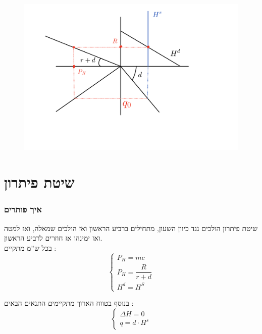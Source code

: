 \documentclass[usenames,dvipsnames]{beamer}
\newcommand{\D}[1]{\Delta #1}
\begin{document}
\begin{RTL}
\begin{frame}[allowframebreaks]
\framebreak
\begin{figure}
    \begin{small}
        \begin{center}
            \includegraphics[width=1.2\textwidth]{figures/SCR-20231209-nblm.png}
        \end{center}
    \end{small}
\end{figure}


\end{frame}

\section{שיטת פיתרון}

\begin{frame}
    \frametitle{איך פותרים}
    \begin{block}{שיטת פיתרון}
        הולכים נגד כיוון השעון, מתחילים ברביע הראשון ואז הולכים שמאלה, ואז למטה ואז ימינהו אז חוזרים לרביע הראשון.
        \\
        בכל ש''מ מתקיים :
        $$\begin{cases}
            P_H = mc \\ 
            P_H = \dfrac{R}{r+d}\\ 
            H^d = H^S
        \end{cases}$$

        בנוסף בטווח הארוך מתקיימים התנאים הבאים :
        $$\begin{cases}
            \D H = 0 \\ 
            q = d \cdot H^s
        \end{cases}$$
    \end{block}
    


\end{frame}
\end{RTL}
\end{document}
